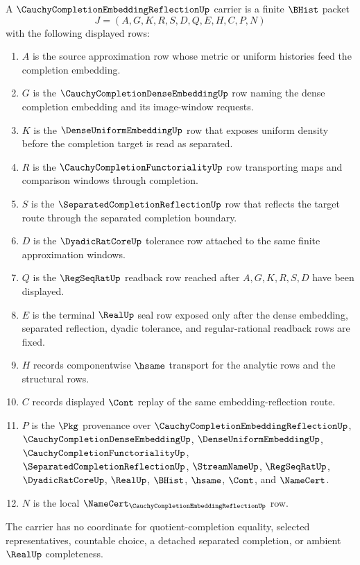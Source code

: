 \begin{definition}
\label{def:cauchy-completion-embedding-reflection-carrier}
A $\CauchyCompletionEmbeddingReflectionUp$ carrier is a finite $\BHist$ packet
$$
J=(A,G,K,R,S,D,Q,E,H,C,P,N)
$$
with the following displayed rows:
\begin{enumerate}
\item $A$ is the source approximation row whose metric or uniform histories feed the completion embedding.
\item $G$ is the $\CauchyCompletionDenseEmbeddingUp$ row naming the dense completion embedding and its image-window requests.
\item $K$ is the $\DenseUniformEmbeddingUp$ row that exposes uniform density before the completion target is read as separated.
\item $R$ is the $\CauchyCompletionFunctorialityUp$ row transporting maps and comparison windows through completion.
\item $S$ is the $\SeparatedCompletionReflectionUp$ row that reflects the target route through the separated completion boundary.
\item $D$ is the $\DyadicRatCoreUp$ tolerance row attached to the same finite approximation windows.
\item $Q$ is the $\RegSeqRatUp$ readback row reached after $A,G,K,R,S,D$ have been displayed.
\item $E$ is the terminal $\RealUp$ seal row exposed only after the dense embedding, separated reflection, dyadic tolerance, and regular-rational readback rows are fixed.
\item $H$ records componentwise $\hsame$ transport for the analytic rows and the structural rows.
\item $C$ records displayed $\Cont$ replay of the same embedding-reflection route.
\item $P$ is the $\Pkg$ provenance over $\CauchyCompletionEmbeddingReflectionUp$, $\CauchyCompletionDenseEmbeddingUp$, $\DenseUniformEmbeddingUp$, $\CauchyCompletionFunctorialityUp$, $\SeparatedCompletionReflectionUp$, $\StreamNameUp$, $\RegSeqRatUp$, $\DyadicRatCoreUp$, $\RealUp$, $\BHist$, $\hsame$, $\Cont$, and $\NameCert$.
\item $N$ is the local $\NameCert_{\CauchyCompletionEmbeddingReflectionUp}$ row.
\end{enumerate}
The carrier has no coordinate for quotient-completion equality, selected representatives, countable choice, a detached separated completion, or ambient $\RealUp$ completeness.
\end{definition}

